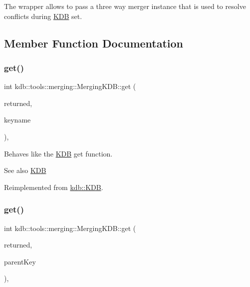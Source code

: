The wrapper allows to pass a three way merger instance that is used to resolve conflicts during \hyperlink{classkdb_1_1KDB}{K\+DB} set. 

\subsection{Member Function Documentation}
\mbox{\label{classkdb_1_1tools_1_1merging_1_1MergingKDB_a0d2a28f24aeb6ba3e81af73ef8b98df7}} 
\subsubsection{\texorpdfstring{get()}{get()}\hspace{0.1cm}{\footnotesize\ttfamily [1/2]}}
{\footnotesize\ttfamily int kdb\+::tools\+::merging\+::\+Merging\+K\+D\+B\+::get (\begin{DoxyParamCaption}\item[{\hyperlink{classkdb_1_1KeySet}{Key\+Set} \&}]{returned,  }\item[{std\+::string const \&}]{keyname }\end{DoxyParamCaption})\hspace{0.3cm}{\ttfamily [override]}, {\ttfamily [virtual]}}



Behaves like the \hyperlink{classkdb_1_1KDB}{K\+DB} get function. 

\begin{DoxySeeAlso}{See also}
\hyperlink{classkdb_1_1KDB}{K\+DB} 
\end{DoxySeeAlso}


Reimplemented from \hyperlink{classkdb_1_1KDB_a0419ffbc273c89756bc523b4223ec25a}{kdb\+::\+K\+DB}.

\mbox{\label{classkdb_1_1tools_1_1merging_1_1MergingKDB_a062b1dac733aa3999691f8d70635b09c}} 
\subsubsection{\texorpdfstring{get()}{get()}\hspace{0.1cm}{\footnotesize\ttfamily [2/2]}}
{\footnotesize\ttfamily int kdb\+::tools\+::merging\+::\+Merging\+K\+D\+B\+::get (\begin{DoxyParamCaption}\item[{\hyperlink{classkdb_1_1KeySet}{Key\+Set} \&}]{returned,  }\item[{\hyperlink{classkdb_1_1Key}{Key} \&}]{parent\+Key }\end{DoxyParamCaption})\hspace{0.3cm}{\ttfamily [override]}, {\ttfamily [virtual]}}



